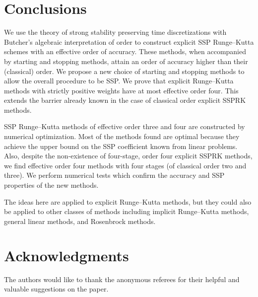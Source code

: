 \documentclass[final]{siamltex}  %
\begin{document}
\section{Conclusions}\label{sec:Conclusion}
We use the theory of strong stability preserving time discretizations
with Butcher's algebraic interpretation of order to construct
explicit SSP Runge--Kutta schemes with an effective order of accuracy.
These methods, when accompanied by starting and stopping
methods, attain an order of accuracy higher than their (classical) order.
We propose a new choice of starting and stopping methods to allow the
overall procedure to be SSP.
We prove that explicit Runge--Kutta methods with strictly positive 
weights have at most effective order four. 
This extends the barrier already known in the case of classical order
explicit SSPRK methods.

SSP Runge--Kutta methods of effective order three and four
are constructed by numerical optimization.
Most of the methods found are optimal because they achieve
the upper bound on the SSP coefficient known from linear
problems.
Also, despite the non-existence of four-stage, order four explicit SSPRK methods, 
we find effective order four methods with four stages (of classical 
order two and three). 
We perform numerical tests which confirm the accuracy and
SSP properties of the new methods.

The ideas here are applied to explicit Runge--Kutta methods, but they
could also be applied to other classes of methods including implicit
Runge--Kutta methods, general linear methods, and Rosenbrock methods.


\section*{Acknowledgments}{%
	The authors would like to thank the anonymous referees for their helpful and valuable 
	suggestions on the paper.
	\vspace*{20pt}
}%



		
\end{document}
